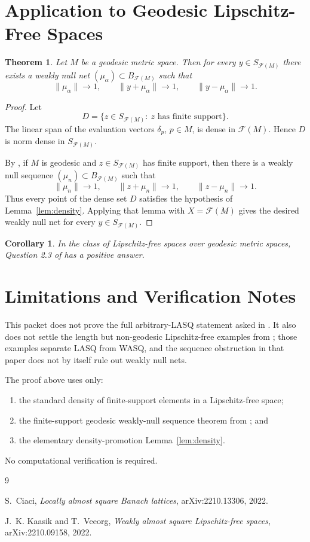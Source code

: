 \documentclass[11pt]{amsart}
\newtheorem{theorem}{Theorem}
\newtheorem{corollary}{Corollary}
\theoremstyle{definition}
\theoremstyle{remark}
\newcommand{\F}{\mathcal F}
\begin{document}
\section{Application to Geodesic Lipschitz-Free Spaces}

\begin{theorem}
\label{thm:geodesic-free-net}
Let \(M\) be a geodesic metric space.  Then for every \(y\in S_{\F(M)}\) there
exists a weakly null net \((\mu_\alpha)\subset B_{\F(M)}\) such that
\[
  \|\mu_\alpha\|\to 1,\qquad
  \|y+\mu_\alpha\|\to 1,\qquad
  \|y-\mu_\alpha\|\to 1 .
\]
\end{theorem}

\begin{proof}
Let
\[
  D=\{z\in S_{\F(M)}:\ z \text{ has finite support}\}.
\]
The linear span of the evaluation vectors \(\delta_p\), \(p\in M\), is dense
in \(\F(M)\).  Hence \(D\) is norm dense in \(S_{\F(M)}\).

By \cite[Proposition in Section 3]{KaasikVeeorg2022}, if \(M\) is geodesic and
\(z\in S_{\F(M)}\) has finite support, then there is a weakly null sequence
\((\mu_n)\subset B_{\F(M)}\) such that
\[
  \|\mu_n\|\to 1,\qquad
  \|z+\mu_n\|\to 1,\qquad
  \|z-\mu_n\|\to 1 .
\]
Thus every point of the dense set \(D\) satisfies the hypothesis of
Lemma~\ref{lem:density}.  Applying that lemma with \(X=\F(M)\) gives the
desired weakly null net for every \(y\in S_{\F(M)}\).
\end{proof}

\begin{corollary}
In the class of Lipschitz-free spaces over geodesic metric spaces, Question 2.3
of \cite{Ciaci2022} has a positive answer.
\end{corollary}

\section{Limitations and Verification Notes}

This packet does not prove the full arbitrary-LASQ statement asked in
\cite{Ciaci2022}.  It also does not settle the length but non-geodesic
Lipschitz-free examples from \cite{KaasikVeeorg2022}; those examples separate
LASQ from WASQ, and the sequence obstruction in that paper does not by itself
rule out weakly null nets.

The proof above uses only:
\begin{enumerate}
\item the standard density of finite-support elements in a Lipschitz-free
space;
\item the finite-support geodesic weakly-null sequence theorem from
\cite{KaasikVeeorg2022}; and
\item the elementary density-promotion Lemma~\ref{lem:density}.
\end{enumerate}
No computational verification is required.

\begin{thebibliography}{9}

S.~Ciaci,
\emph{Locally almost square Banach lattices},
arXiv:2210.13306, 2022.

J.~K. Kaasik and T.~Veeorg,
\emph{Weakly almost square Lipschitz-free spaces},
arXiv:2210.09158, 2022.

\end{thebibliography}
\end{document}
